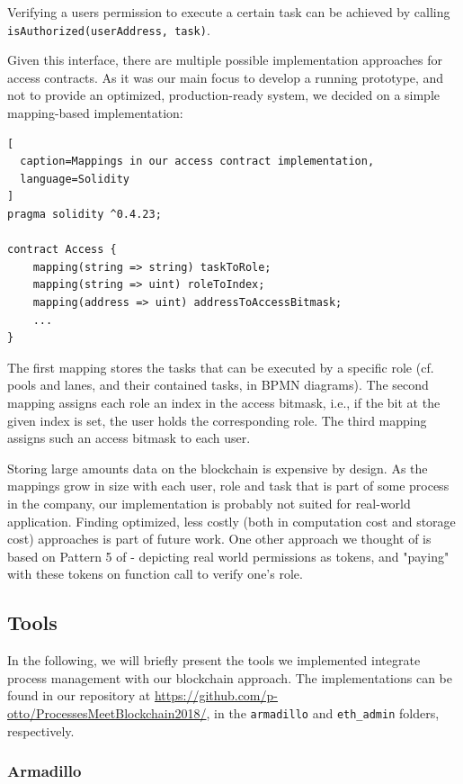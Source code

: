 \documentclass[runningheads]{llncs}
\begin{document}
Verifying a users permission to execute a certain task can be achieved by calling \texttt{isAuthorized(userAddress, task)}.
\newline

Given this interface, there are multiple possible implementation approaches for access contracts.
As it was our main focus to develop a running prototype, and not to provide an optimized, production-ready system, we decided on a simple mapping-based implementation:
\begin{lstlisting}[
  caption=Mappings in our access contract implementation,
  language=Solidity
]
pragma solidity ^0.4.23;

contract Access {
    mapping(string => string) taskToRole;
    mapping(string => uint) roleToIndex;
    mapping(address => uint) addressToAccessBitmask;
    ...
}
\end{lstlisting}
The first mapping stores the tasks that can be executed by a specific role (cf. pools and lanes, and their contained tasks, in BPMN diagrams).
The second mapping assigns each role an index in the access bitmask, i.e., if the bit at the given index is set, the user holds the corresponding role.
The third mapping assigns such an access bitmask to each user.

Storing large amounts data on the blockchain is expensive by design.
As the mappings grow in size with each user, role and task that is part of some process in the company, our implementation is probably not suited for real-world application.
Finding optimized, less costly (both in computation cost and storage cost) approaches is part of future work.
One other approach we thought of is based on Pattern 5 of \cite{xu2018pattern} - depicting real world permissions as tokens, and "paying" with these tokens on function call to verify one's role.

\subsection{Tools}

In the following, we will briefly present the tools we implemented integrate process management with our blockchain approach.
The implementations can be found in our repository at \url{https://github.com/p-otto/ProcessesMeetBlockchain2018/}, in the \texttt{armadillo} and \texttt{eth\_admin} folders, respectively.


\subsubsection{Armadillo}
\end{document}
